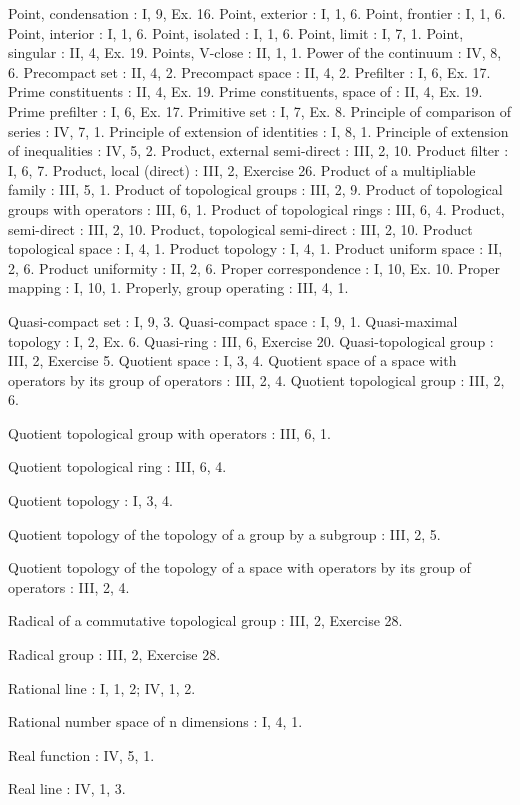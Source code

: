 Point, condensation : I, 9, Ex. 16. Point, exterior : I, 1, 6. Point, frontier : I, 1, 6. Point, interior : I, 1, 6. Point, isolated : I, 1, 6. Point, limit : I, 7, 1. Point, singular : II, 4, Ex. 19. Points, V-close : II, 1, 1. Power of the continuum : IV, 8, 6. Precompact set : II, 4, 2. Precompact space : II, 4, 2. Prefilter : I, 6, Ex. 17. Prime constituents : II, 4, Ex. 19. Prime constituents, space of : II, 4, Ex. 19. Prime prefilter : I, 6, Ex. 17. Primitive set : I, 7, Ex. 8. Principle of comparison of series : IV, 7, 1. Principle of extension of identities : I, 8, 1. Principle of extension of inequalities : IV, 5, 2. Product, external semi-direct : III, 2, 10. Product filter : I, 6, 7. Product, local (direct) : III, 2, Exercise 26. Product of a multipliable family : III, 5, 1. Product of topological groups : III, 2, 9. Product of topological groups with operators : III, 6, 1. Product of topological rings : III, 6, 4. Product, semi-direct : III, 2, 10. Product, topological semi-direct : III, 2, 10. Product topological space : I, 4, 1. Product topology : I, 4, 1. Product uniform space : II, 2, 6. Product uniformity : II, 2, 6. Proper correspondence : I, 10, Ex. 10. Proper mapping : I, 10, 1. Properly, group operating : III, 4, 1.

Quasi-compact set : I, 9, 3. Quasi-compact space : I, 9, 1. Quasi-maximal topology : I, 2, Ex. 6. Quasi-ring : III, 6, Exercise 20. Quasi-topological group : III, 2, Exercise 5. Quotient space : I, 3, 4. Quotient space of a space with operators by its group of operators : III, 2, 4. Quotient topological group : III, 2, 6.

Quotient topological group with operators : III, 6, 1.

Quotient topological ring : III, 6, 4.

Quotient topology : I, 3, 4.

Quotient topology of the topology of a group by a subgroup : III, 2, 5.

Quotient topology of the topology of a space with operators by its group of operators : III, 2, 4.

Radical of a commutative topological group : III, 2, Exercise 28.

Radical group : III, 2, Exercise 28.

Rational line : I, 1, 2; IV, 1, 2.

Rational number space of n dimensions : I, 4, 1.

Real function : IV, 5, 1.

Real line : IV, 1, 3.

